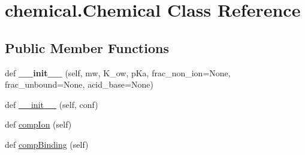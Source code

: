 \hypertarget{classchemical_1_1Chemical}{}\section{chemical.\+Chemical Class Reference}
\label{classchemical_1_1Chemical}
\subsection*{Public Member Functions}
\begin{DoxyCompactItemize}
\item 
def {\bfseries \+\_\+\+\_\+init\+\_\+\+\_\+} (self, mw, K\+\_\+ow, p\+Ka, frac\+\_\+non\+\_\+ion=None, frac\+\_\+unbound=None, acid\+\_\+base=None)\hypertarget{classchemical_1_1Chemical_a217516c99fbf0e2788782d27a261ec89}{}\label{classchemical_1_1Chemical_a217516c99fbf0e2788782d27a261ec89}

\item 
def \hyperlink{classchemical_1_1Chemical_a1aecc1f2e21b20636f65d45b3787f500}{\+\_\+\+\_\+init\+\_\+\+\_\+} (self, conf)
\item 
def \hyperlink{classchemical_1_1Chemical_a3633520af63f8eb799a8f0de381422e0}{comp\+Ion} (self)
\item 
def \hyperlink{classchemical_1_1Chemical_af738fbeec1e013883784f479ffa19852}{comp\+Binding} (self)
\end{DoxyCompactItemize}
